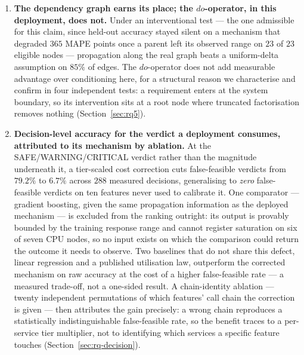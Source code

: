 \documentclass[journal, 10pt]{IEEEtran}
\begin{document}
\begin{enumerate}
    \item \textbf{The dependency graph earns its place; the $do$-operator, in this deployment, does not.} Under an interventional test --- the one admissible for this claim, since held-out accuracy stayed silent on a mechanism that degraded $365$ MAPE points once a parent left its observed range on $23$ of $23$ eligible nodes --- propagation along the real graph beats a uniform-delta assumption on $85\%$ of edges. The $do$-operator does not add measurable advantage over conditioning here, for a structural reason we characterise and confirm in four independent tests: a requirement enters at the system boundary, so its intervention sits at a root node where truncated factorisation removes nothing (Section~\ref{sec:rq5}).
    \item \textbf{Decision-level accuracy for the verdict a deployment consumes, attributed to its mechanism by ablation.} At the SAFE/WARNING/CRITICAL verdict rather than the magnitude underneath it, a tier-scaled cost correction cuts false-feasible verdicts from $79.2\%$ to $6.7\%$ across $288$ measured decisions, generalising to \emph{zero} false-feasible verdicts on ten features never used to calibrate it. One comparator --- gradient boosting, given the same propagation information as the deployed mechanism --- is excluded from the ranking outright: its output is provably bounded by the training response range and cannot register saturation on six of seven CPU nodes, so no input exists on which the comparison could return the outcome it needs to observe. Two baselines that do not share this defect, linear regression and a published utilisation law, outperform the corrected mechanism on raw accuracy at the cost of a higher false-feasible rate --- a measured trade-off, not a one-sided result. A chain-identity ablation --- twenty independent permutations of which features' call chain the correction is given --- then attributes the gain precisely: a wrong chain reproduces a statistically indistinguishable false-feasible rate, so the benefit traces to a per-service tier multiplier, not to identifying which services a specific feature touches (Section~\ref{sec:rq-decision}).

\end{enumerate}
\end{document}
